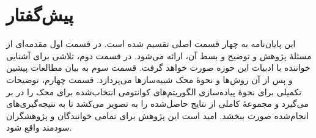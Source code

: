 \newpage
\vspace*{-1cm}
\section*{پیش‌گفتار}
این پایان‌نامه به چهار قسمت اصلی تقسیم شده است. در قسمت اول مقدمه‌ای از مسئلهٔ پژوهش و توضیح و بسط آن، ارائه می‌شود. در قسمت دوم، تلاشی برای آشنایی خواننده با ادبیات این حوزه صورت خواهد گرفت. قسمت سوم به بیان مطالعات پیشین و پس از آن روش‌ها و نحوهٔ محک شبیه‌سازها می‌پردازد. قسمت چهارم، توضیحات تکمیلی برای نحوهٔ پیاده‌سازی الگوریتم‌های کوانتومی انتخاب‌شده برای محک را در بر می‌گیرد و مجموعهٔ کاملی از نتایج حاصل‌شده را به تصویر می‌کشد تا به نتیجه‌گیری‌های انجام‌شده صورت ببخشد. امید است این پژوهش برای تمامی خوانندگان و پژوهشگران سودمند واقع شود.